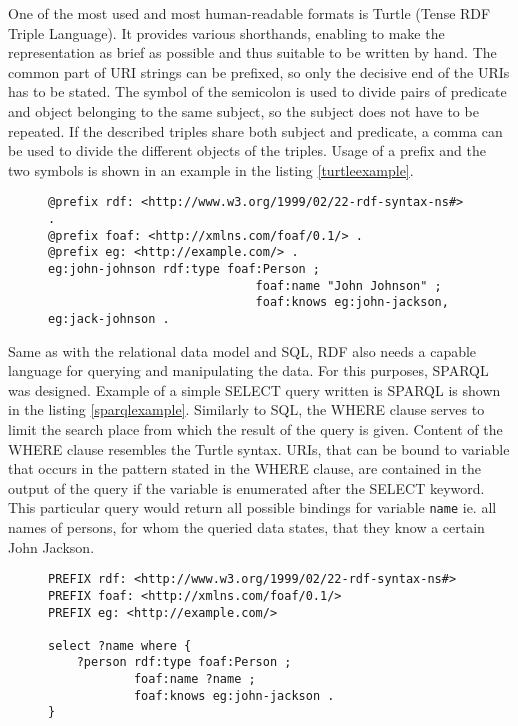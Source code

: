 One of the most used and most human-readable formats is Turtle (Tense RDF Triple Language).\cite{turtlew3c2014} It provides various shorthands, enabling to make the representation as brief as possible and thus suitable to be written by hand. The common part of URI strings can be prefixed, so only the decisive end of the URIs has to be stated. The symbol of the semicolon is used to divide pairs of predicate and object belonging to the same subject, so the subject does not have to be repeated. If the described triples share both subject and predicate, a comma can be used to divide the different objects of the triples. Usage of a prefix and the two symbols is shown in an example in the listing \ref{turtleexample}.

\begin{figure}[h]
\begin{lstlisting}[language = turtle, caption={Example of RDF data described in Turtle format (Source: author)}, label={turtleexample},captionpos=b escapeinside={(*@}{@*)}]
@prefix rdf: <http://www.w3.org/1999/02/22-rdf-syntax-ns#> .
@prefix foaf: <http://xmlns.com/foaf/0.1/> .
@prefix eg: <http://example.com/> .
eg:john-johnson rdf:type foaf:Person ;
                             foaf:name "John Johnson" ;
                             foaf:knows eg:john-jackson, eg:jack-johnson .
\end{lstlisting}
\end{figure}

Same as with the relational data model and SQL, RDF also needs a capable language for querying and manipulating the data. For this purposes, SPARQL was designed.\cite{sparqlw3c2008} Example of a simple SELECT query written is SPARQL is shown in the listing \ref{sparqlexample}. Similarly to SQL, the WHERE clause serves to limit the search place from which the result of the query is given. Content of the WHERE clause resembles the Turtle syntax. URIs, that can be bound to variable that occurs in the pattern stated in the WHERE clause, are contained in the output of the query if the variable is enumerated after the SELECT keyword. This particular query would return all possible bindings for variable \verb|name| ie. all names of persons, for whom the queried data states, that they know a certain John Jackson.

\begin{figure}[h]
\begin{lstlisting}[language = SPARQL, caption={Example of a simple SPARQL query (Source: author)}, label={sparqlexample},captionpos=b escapeinside={(*@}{@*)}]
PREFIX rdf: <http://www.w3.org/1999/02/22-rdf-syntax-ns#>
PREFIX foaf: <http://xmlns.com/foaf/0.1/>
PREFIX eg: <http://example.com/>

select ?name where {
    ?person rdf:type foaf:Person ;
            foaf:name ?name ;
            foaf:knows eg:john-jackson .
}
\end{lstlisting}
\end{figure}


